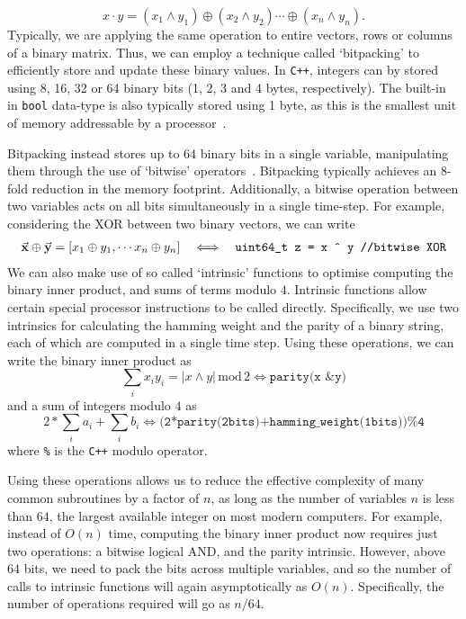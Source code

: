 \[x\cdot y = \left(x_{1}\wedge y_{1}\right)\oplus\left(x_{2}\wedge y_{2}\right)\cdots\oplus\left(x_{n}\wedge y_{n}\right).\]
Typically, we are applying the same operation to entire vectors, rows or columns of a binary matrix. Thus, we can employ a technique called `bitpacking' to efficiently store and update these binary values. In \texttt{C++}, integers can by stored using 8, 16, 32 or 64 binary bits (1, 2, 3 and 4 bytes, respectively). The built-in in \texttt{bool} data-type is also typically stored using 1 byte, as this is the smallest unit of memory addressable by a processor~\cite{CPPRefTypes}.\par
Bitpacking instead stores up to 64 binary bits in a single variable, manipulating them through the use of `bitwise' operators~\cite{CPPRefBitwise}. Bitpacking typically achieves an $8$-fold reduction in the memory footprint. Additionally, a bitwise operation between two variables acts on all bits simultaneously in a single time-step. For example, considering the XOR between two binary vectors, we can write
\[
\begin{array}{rcl}
\va{x}\oplus \va{y} = [x_{1}\oplus y_{1},\cdots x_{n}\oplus y_{n}] & \iff &
\texttt{uint64\_t z = x \^{} y //bitwise XOR}
\end{array}
\]
We can also make use of so called `intrinsic' functions to optimise computing the binary inner product, and sums of terms modulo $4$. Intrinsic functions allow certain special processor instructions to be called directly. Specifically, we use two intrinsics for calculating the hamming weight and the parity of a binary string, each of which are computed in a single time step. Using these operations, we can write the binary inner product as
\[\sum_{i}x_{i}y_{i} = \left\vert x\wedge y\right\vert\,\text{mod}\,2\iff \texttt{parity(x \& y)}\]
and a sum of integers modulo $4$ as
\[2*\sum_{i}a_{i}+\sum_{i}b_{i}\iff \texttt{(2*parity(2bits)+hamming\_weight(1bits))\%4}\]
where \texttt{\%} is the \texttt{C++} modulo operator.\par
Using these operations allows us to reduce the effective complexity of many common subroutines by a factor of $n$, as long as the number of variables $n$ is less than $64$, the largest available integer on most modern computers. For example, instead of $O(n)$ time, computing the binary inner product now requires just two operations: a bitwise logical AND, and the parity intrinsic. However, above $64$ bits, we need to pack the bits across multiple variables, and so the number of calls to intrinsic functions will again asymptotically as $O(n)$. Specifically, the number of operations required will go as $n/64$.\par
